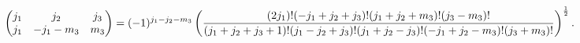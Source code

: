 \[\begin{pmatrix}j_{1}&j_{2}&j_{3}\\
j_{1}&-j_{1}-m_{3}&m_{3}\end{pmatrix}=(-1)^{j_{1}-j_{2}-m_{3}}\left(\frac{(2j_%
{1})!(-j_{1}+j_{2}+j_{3})!(j_{1}+j_{2}+m_{3})!(j_{3}-m_{3})!}{(j_{1}+j_{2}+j_{%
3}+1)!(j_{1}-j_{2}+j_{3})!(j_{1}+j_{2}-j_{3})!(-j_{1}+j_{2}-m_{3})!(j_{3}+m_{3%
})!}\right)^{\frac{1}{2}}.\]